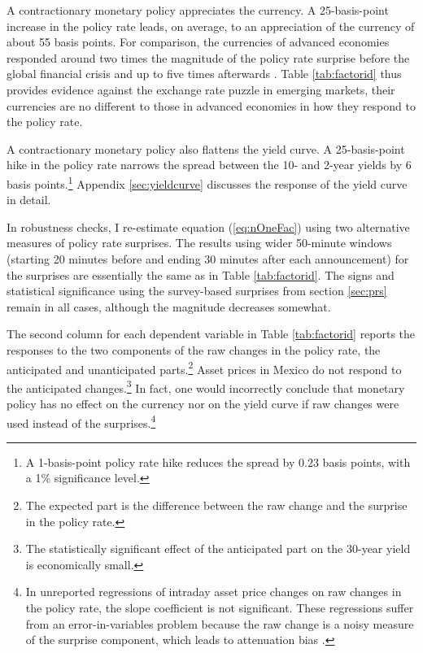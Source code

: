 A contractionary monetary policy appreciates the currency. A 25-basis-point increase in the policy rate leads, on average, to an appreciation of the currency of about 55 basis points. For comparison, the currencies of advanced economies responded around two times the magnitude of the policy rate surprise before the global financial crisis \parencite{Rosa:2011JBF} and up to five times afterwards \parencite{Wright:2012,FerrariKearnsSchrimpf:2021}. Table \ref{tab:factorid} thus provides evidence against the exchange rate puzzle in emerging markets, their currencies are no different to those in advanced economies in how they respond to the policy rate.

A contractionary monetary policy also flattens the yield curve. A 25-basis-point hike in the policy rate narrows the spread between the 10- and 2-year yields by 6 basis points.\footnote{A 1-basis-point policy rate hike reduces the spread by \(0.23\) basis points, with a 1\% significance level.} 
Appendix \ref{sec:yieldcurve} discusses the response of the yield curve in detail. 

In robustness checks, I re-estimate equation (\ref{eq:nOneFac}) using two alternative measures of policy rate surprises. The results using wider 50-minute windows (starting 20 minutes before and ending 30 minutes after each announcement) for the surprises are essentially the same as in Table \ref{tab:factorid}. The signs and statistical significance using the survey-based surprises from section \ref{sec:prs} remain in all cases, although the magnitude decreases somewhat. 

The second column for each dependent variable in Table \ref{tab:factorid} reports the responses to the two components of the raw changes in the policy rate, the anticipated and unanticipated parts.\footnote{The expected part is the difference between the raw change and the surprise in the policy rate.} Asset prices in Mexico do not respond to the anticipated changes.\footnote{The statistically significant effect of the anticipated part on the 30-year yield is economically small.} In fact, one would incorrectly conclude that monetary policy has no effect on the currency nor on the yield curve if raw changes were used instead of the surprises.\footnote{In unreported regressions of intraday asset price changes on raw changes in the policy rate, the slope coefficient is not significant. These regressions suffer from an error-in-variables problem because the raw change is a noisy measure of the surprise component, which leads to attenuation bias \parencite{Kuttner:2001}.} 

